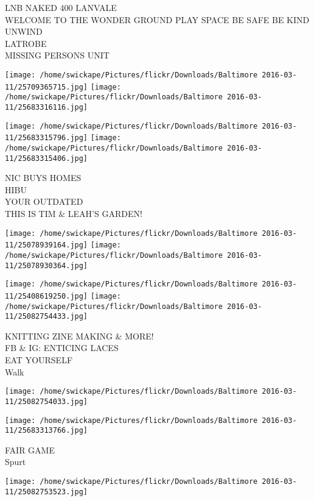 \documentclass[10pt,letterpaper]{article}
\begin{document}
LNB NAKED 400 LANVALE\\
WELCOME TO THE WONDER GROUND PLAY SPACE BE SAFE BE KIND UNWIND\\
LATROBE\\
MISSING PERSONS UNIT\\
\pagebreak

\texttt{[image: /home/swickape/Pictures/flickr/Downloads/Baltimore 2016-03-11/25709365715.jpg]}
\texttt{[image: /home/swickape/Pictures/flickr/Downloads/Baltimore 2016-03-11/25683316116.jpg]}

\texttt{[image: /home/swickape/Pictures/flickr/Downloads/Baltimore 2016-03-11/25683315796.jpg]}
\texttt{[image: /home/swickape/Pictures/flickr/Downloads/Baltimore 2016-03-11/25683315406.jpg]}

NIC BUYS HOMES\\
HIBU\\
YOUR OUTDATED\\
THIS IS TIM \& LEAH'S GARDEN!\\
\pagebreak

\texttt{[image: /home/swickape/Pictures/flickr/Downloads/Baltimore 2016-03-11/25078939164.jpg]}
\texttt{[image: /home/swickape/Pictures/flickr/Downloads/Baltimore 2016-03-11/25078930364.jpg]}

\texttt{[image: /home/swickape/Pictures/flickr/Downloads/Baltimore 2016-03-11/25408619250.jpg]}
\texttt{[image: /home/swickape/Pictures/flickr/Downloads/Baltimore 2016-03-11/25082754433.jpg]}

KNITTING ZINE MAKING \& MORE!\\
FB \& IG: ENTICING LACES\\
EAT YOURSELF\\
Walk\\
\pagebreak

\texttt{[image: /home/swickape/Pictures/flickr/Downloads/Baltimore 2016-03-11/25082754033.jpg]}

\vspace{0.25in}
\texttt{[image: /home/swickape/Pictures/flickr/Downloads/Baltimore 2016-03-11/25683313766.jpg]}

FAIR GAME\\
Spurt\\
\pagebreak

\texttt{[image: /home/swickape/Pictures/flickr/Downloads/Baltimore 2016-03-11/25082753523.jpg]}
\end{document}
